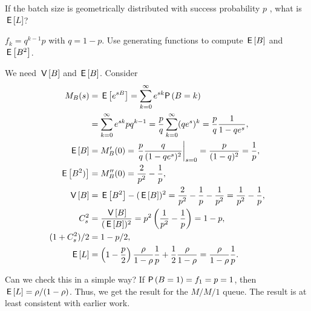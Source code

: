 \begin{exercise}
 If the batch size is geometrically distributed with success probability $p$ , what is $\,\mathsf{E}\left[L\right]$?
\begin{hint}
$f_k=q^{k-1}p$ with $q=1-p$. Use generating functions to compute $\,\mathsf{E}\left[B\right]$ and $\,\mathsf{E}\left[B^2\right]$.
\end{hint}
\begin{solution}
 We need $\,\mathsf{V}\left[B\right]$ and $\,\mathsf{E}\left[B\right]$. Consider
 \begin{align*}
 M_B(s) 
&= \E{e^{sB}} = \sum_{k=0}^\infty e^{sk} \P{B=k} \\
&= \sum_{k=0}^\infty e^{sk} p q^{k-1} 
= \frac p q \sum_{k=0}^\infty (q e^s)^k = \frac p q \frac1{1-qe^s},\\
 \E B &= M_B'(0) = \left.\frac p q \frac q{(1-q e^s)^2}\right|_{s=0}= \frac p{(1-q)^2} = \frac 1 p,\\
 \E{B^2)} &= M_B''(0) = \frac2{p^2} - \frac1p, \\
 \V B &= \E{B^2} - (\E B)^2 = \frac2{p^2} - \frac1p - \frac1{p^2} = \frac1{p^2}-\frac1p,\\
 C_s^2&= \frac{\V B}{(\E B)^2} = p^2 \left(\frac1{p^2}-\frac1p\right)=1-p,\\
 (1+C_s^2)/2 &= 1-p/2,\\
 \E L &= 
\left(1-\frac p2\right) \frac\rho{1-\rho} \frac 1 p + \frac12\frac\rho{1-\rho}
=\frac\rho{1-\rho} \frac 1 p.
\end{align*}

Can we check this in a simple way? If $\P{B=1}=f_1 = p =1$, then
$\,\mathsf{E}\left[L\right]=\rho/(1-\rho)$. Thus, we get the result for the $M/M/1$
queue. The result is at least consistent with earlier work.
\end{solution}
\end{exercise}

